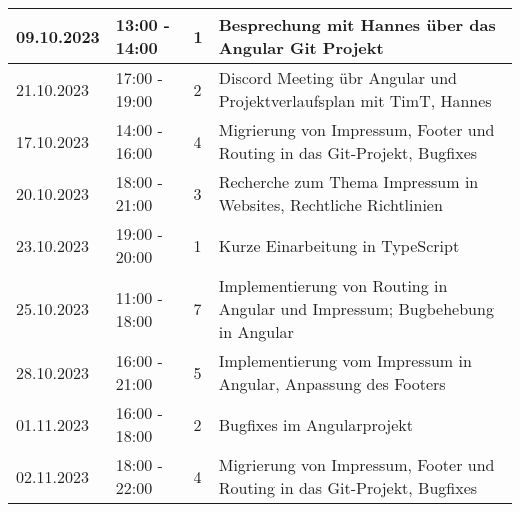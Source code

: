 \begin{flushleft}
\begin{longtable}{p{2cm}p{}p{2cm}p{}}
            09.10.2023 & 13:00 - 14:00 & 1 & Besprechung mit Hannes über das Angular Git Projekt \\  \midrule
            21.10.2023 & 17:00 - 19:00 & 2 & Discord Meeting übr Angular und Projektverlaufsplan mit TimT, Hannes \\  \midrule
            17.10.2023 & 14:00 - 16:00 & 4 & Migrierung von Impressum, Footer und Routing in das Git-Projekt, Bugfixes \\  \midrule
            20.10.2023 & 18:00 - 21:00 & 3 & Recherche zum Thema Impressum in Websites, Rechtliche Richtlinien \\  \midrule
            23.10.2023 & 19:00 - 20:00 & 1 & Kurze Einarbeitung in TypeScript \\  \midrule
            25.10.2023 & 11:00 - 18:00 & 7 & Implementierung von Routing in Angular und Impressum; Bugbehebung in Angular \\  \midrule
            28.10.2023 & 16:00 - 21:00 & 5 & Implementierung vom Impressum in Angular, Anpassung des Footers \\  \midrule
            01.11.2023 & 16:00 - 18:00 & 2 & Bugfixes im Angularprojekt \\  \midrule
            02.11.2023 & 18:00 - 22:00 & 4 & Migrierung von Impressum, Footer und Routing in das Git-Projekt, Bugfixes \\  \midrule
            \bottomrule
    \end{longtable}
\end{flushleft}
